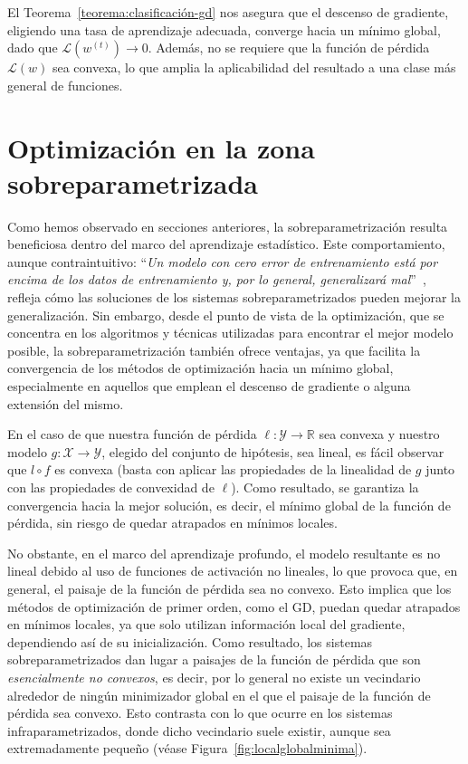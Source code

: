 El Teorema~\ref{teorema:clasificación-gd} nos asegura que el descenso de gradiente, eligiendo una tasa de aprendizaje adecuada, converge hacia un mínimo global, dado que $\mathcal{L}(w^{(t)}) \to 0$. Además, no se requiere que la función de pérdida $\mathcal{L}(w)$ sea convexa, lo que amplia la aplicabilidad del resultado a una clase más general de funciones.

\section{Optimización en la zona sobreparametrizada}\label{sec:optimizacion-zona-sobreparametrizada}
Como hemos observado en secciones anteriores, la sobreparametrización resulta beneficiosa dentro del marco del aprendizaje estadístico. Este comportamiento, aunque contraintuitivo: ``\textit{Un modelo con cero error de entrenamiento está por encima de los datos de entrenamiento y, por lo general, generalizará mal}''~\cite{Hastie2001}, refleja cómo las soluciones de los sistemas sobreparametrizados pueden mejorar la generalización. Sin embargo, desde el punto de vista de la optimización, que se concentra en los algoritmos y técnicas utilizadas para encontrar el mejor modelo posible, la sobreparametrización también ofrece ventajas, ya que facilita la convergencia de los métodos de optimización hacia un mínimo global, especialmente en aquellos que emplean el descenso de gradiente o alguna extensión del mismo.

En el caso de que nuestra función de pérdida $\ell: \mathcal{Y} \to \mathbb{R}$ sea convexa y nuestro modelo $g: \mathcal{X} \to \mathcal{Y}$, elegido del conjunto de hipótesis, sea lineal, es fácil observar que $l \circ f$ es convexa (basta con aplicar las propiedades de la linealidad de $g$ junto con las propiedades de convexidad de $\ell$). Como resultado, se garantiza la convergencia hacia la mejor solución, es decir, el mínimo global de la función de pérdida, sin riesgo de quedar atrapados en mínimos locales.

No obstante, en el marco del aprendizaje profundo, el modelo resultante es no lineal debido al uso de funciones de activación no lineales, lo que provoca que, en general, el paisaje de la función de pérdida sea no convexo. Esto implica que los métodos de optimización de primer orden, como el GD, puedan quedar atrapados en mínimos locales, ya que solo utilizan información local del gradiente, dependiendo así de su inicialización. Como resultado, los sistemas sobreparametrizados dan lugar a paisajes de la función de pérdida que son \textit{esencialmente no convexos}, es decir, por lo general no existe un vecindario alrededor de ningún minimizador global en el que el paisaje de la función de pérdida sea convexo. Esto contrasta con lo que ocurre en los sistemas infraparametrizados, donde dicho vecindario suele existir, aunque sea extremadamente pequeño (véase Figura~\ref{fig:localglobalminima}).

